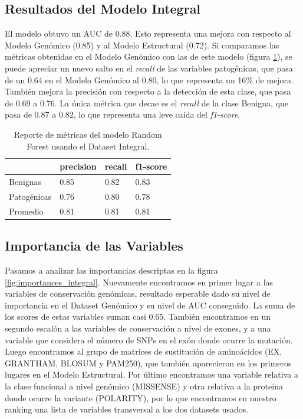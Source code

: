 \subsection{Resultados del Modelo Integral}

El modelo obtuvo un AUC de 0.88. Esto representa una mejora con respecto al Modelo Genómico (0.85) y al Modelo Estructural (0.72). Si comparamos las métricas obtenidas en el Modelo Genómico con las de este modelo (figura \ref{tab:metrics_integral}), se puede apreciar un nuevo salto en el \textit{recall} de las variables patogénicas, que pasa de un 0.64 en el Modelo Genómico al 0.80, lo que representa un 16\% de mejora. También mejora la precisión con respecto a la detección de esta clase, que pasa de 0.69 a 0.76. La única métrica que decae es el \textit{recall} de la clase Benigna, que pasa de 0.87 a 0.82, lo que representa una leve caída del \textit{f1-score}.

\begin{table}[H]
\centering
\begin{tabular}{|l|l|l|l|}
\hline
             & precision & recall & f1-score \\ \hline
Benignas     & 0.85      & 0.82   & 0.83     \\ \hline
Patogénicas  & 0.76      & 0.80   & 0.78     \\ \hline
Promedio     & 0.81      & 0.81   & 0.81     \\ \hline
\end{tabular}
\caption{Reporte de métricas del modelo Random Forest usando el Dataset Integral.}
\label{tab:metrics_integral}
\end{table}


\subsection{Importancia de las Variables}

Pasamos a analizar las importancias descriptas en la figura \ref{fig:importances_integral}. Nuevamente encontramos en primer lugar a las variables de conservación genómicas, resultado esperable dado su nivel de importancia en el Dataset Genómico y su nivel de AUC conseguido. La suma de los scores de estas variables suman casi 0.65. También encontramos en un segundo escalón a las variables de conservación a nivel de exones, y a una variable que considera el número de SNPs en el exón donde ocurre la mutación. Luego encontramos al grupo de matrices de sustitución de aminoácidos (EX, GRANTHAM, BLOSUM y PAM250), que también aparecieron en los primeros lugares en el Modelo Estructural. Por último encontramos una variable relativa a la clase funcional a nivel genómico (MISSENSE) y otra relativa a la proteína donde ocurre la variante (POLARITY), por lo que encontramos en nuestro ranking una lista de variables transversal a los dos datasets usados. 


